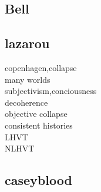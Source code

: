 \documentclass[12pt] {article}
\begin{document}
\subsection*{Bell}
\subsection*{lazarou}
copenhagen,collapse\\many worlds\\subjectivism,conciousness\\decoherence\\objective collapse\\consistent histories\\LHVT\\NLHVT
\subsection*{caseyblood}
\end{document}
